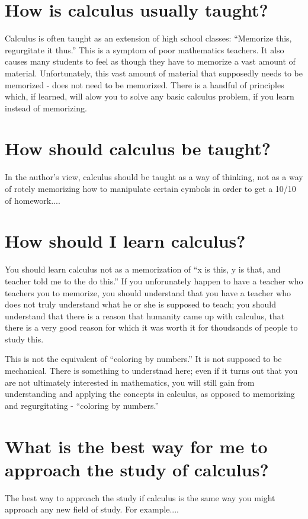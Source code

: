 \section{How is calculus usually taught?}
Calculus is often taught as an extension of high school classes: ``Memorize this, regurgitate it thus.'' This is a symptom of poor mathematics teachers. It also causes many students to feel as though they have to memorize a vast amount of material. Unfortunately, this vast amount of material that supposedly needs to be memorized - does not need to be memorized. There is a handful of principles which, if learned, will alow you to solve any basic calculus problem, if you learn instead of memorizing.

\section{How should calculus be taught?}
In the author's view, calculus should be taught as a way of thinking, not as a way of rotely memorizing how to manipulate certain cymbols in order to get a 10/10 of homework....

\section{How should I learn calculus?}
You should learn calculus not as a memorization of ``x is this, y is that, and teacher told me to the do this.'' If you unforunately happen to have a teacher who teachers you to memorize, you should understand that you have a teacher who does not truly understand what he or she is supposed to teach; you should understand that there is a reason that humanity came up with calculus, that there is a very good reason for which it was worth it for thoudsands of people to study this. 

This is not the equivalent of ``coloring by numbers.'' It is not supposed to be mechanical. There is something to understnad here; even if it turns out that you are not ultimately interested in mathematics, you will still gain from understanding and applying the concepts in calculus, as opposed to memorizing and regurgitating - ``coloring by numbers.''

\section{What is the best way for me to approach the study of calculus?}
The best way to approach the study if calculus is the same way you might approach any new field of study. For example....

